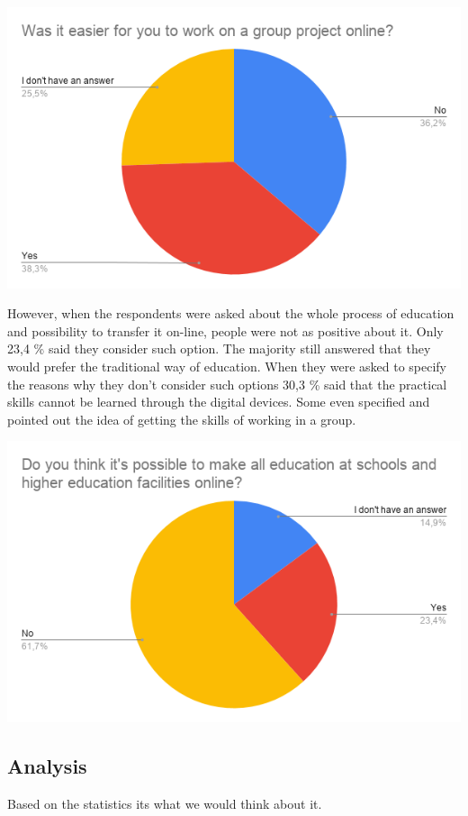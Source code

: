\documentclass[10pt,oneside,english,a4paper]{article}
\begin{document}
\includegraphics[width=\textwidth]{group_work.png}

However, when the respondents were asked about the whole process of education and possibility to transfer it on-line, people were not as positive about it. Only 23,4 \% said they consider such option. The majority still answered that they would prefer the traditional way of education. When they were asked to specify the reasons why they don't consider such options 30,3 \% said that the practical skills cannot be learned through the digital devices. Some even specified and pointed out the idea of getting the skills of working in a group. 

\includegraphics[width=\textwidth]{diagram3.png}


\subsection{Analysis} \label{analysis}

Based on the statistics its what we would think about it.
\end{document}
